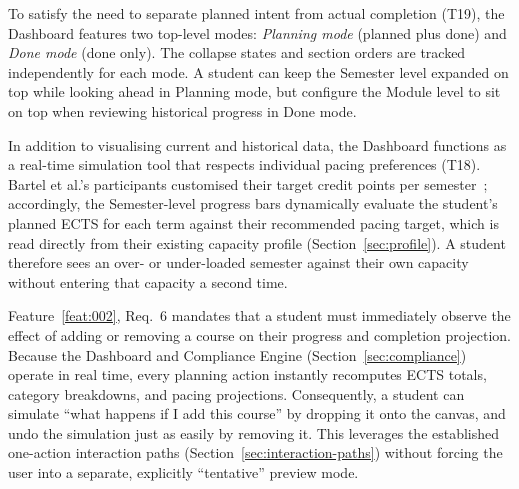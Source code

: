 To satisfy the need to separate planned intent from actual completion (T19), the Dashboard features two top-level modes: \emph{Planning mode} (planned plus done) and \emph{Done mode} (done only). The collapse states and section orders are tracked independently for each mode. A student can keep the Semester level expanded on top while looking ahead in Planning mode, but configure the Module level to sit on top when reviewing historical progress in Done mode.

In addition to visualising current and historical data, the Dashboard functions as a real-time simulation tool that respects individual pacing preferences (T18). Bartel et al.'s participants customised their target credit points per semester~\cite{bartel_design_2024}; accordingly, the Semester-level progress bars dynamically evaluate the student's planned ECTS for each term against their recommended pacing target, which is read directly from their existing capacity profile (Section~\ref{sec:profile}). A student therefore sees an over- or under-loaded semester against their own capacity without entering that capacity a second time.

Feature~\ref{feat:002}, Req.~6 mandates that a student must immediately observe the effect of adding or removing a course on their progress and completion projection. Because the Dashboard and Compliance Engine (Section~\ref{sec:compliance}) operate in real time, every planning action instantly recomputes ECTS totals, category breakdowns, and pacing projections. Consequently, a student can simulate \enquote{what happens if I add this course} by dropping it onto the canvas, and undo the simulation just as easily by removing it. This leverages the established one-action interaction paths (Section~\ref{sec:interaction-paths}) without forcing the user into a separate, explicitly \enquote{tentative} preview mode.

